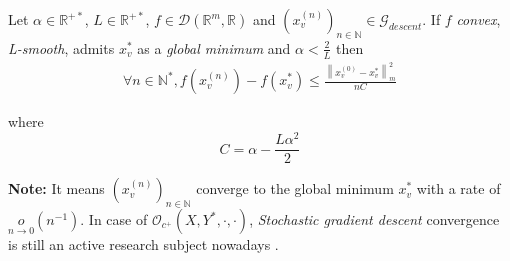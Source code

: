 \documentclass[11pt,en]{elegantpaper}
\newcommand{\norm}[1]{\left\lVert#1\right\rVert}
\newcommand{\Real}{\mathbb{R}}
\begin{document}
\begin{proposition}
  {\normalfont
    Let $\alpha \in \Real^{+*}$, $L \in \Real^{+*}$, $f \in \mathcal{D}(\Real^m,\Real)$ and $(x_v^{(n)})_{n \in \mathbb{N}} \in \mathcal{G}_{descent}$.
    If $f$ \textit{convex}, \textit{L-smooth}, admits $x_v^*$ as a \textit{global minimum} and $\alpha < \frac{2}{L}$ then \begin{equation*}
      \begin{gathered}
        \forall n \in \mathbb{N}^*, f(x_v^{(n)}) - f(x_v^*) \leq \frac{\norm{x_v^{(0)} - x_v^*}^2_m}{nC}
      \end{gathered}
    \end{equation*} \par where \begin{equation*}
      C = \alpha - \frac{L\alpha^2}{2}
    \end{equation*}
  
    \textbf{Note:} It means $(x_v^{(n)})_{n \in \mathbb{N}}$ converge to the global minimum $x_v^*$ with a rate of $\underset{n \to 0}{o}(n^{-1})$.
    In case of $\mathcal{O}_{c^+}(X,Y^*,\cdot,\cdot)$, \textit{Stochastic gradient descent} convergence is still an active research subject
    nowadays \citep{gradconv_stochastic:0}.
  }
\end{proposition}
\end{document}
